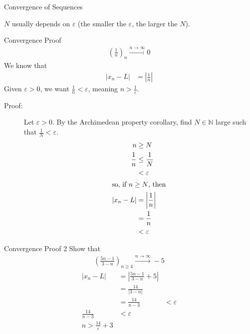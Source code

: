\documentclass[10pt]{extarticle}
\newcommand{\N}{\mathbb{N}}
\begin{document}
\begin{problem}{Convergence of Sequences}
    \begin{description}
      \small
      \item[Note:] $N$ usually depends on $\varepsilon$ (the smaller the $\varepsilon$, the larger the $N$).
    \end{description}
    \begin{problem}{Convergence Proof}
      \begin{align*}
        \left(\frac{1}{n}\right)_{n} \xrightarrow{n\rightarrow\infty} 0
      \end{align*}
      \tcblower
      We know that
      \begin{align*}
        |x_n - L| &= \left|\frac{1}{n}\right|
      \end{align*}
      Given $\varepsilon > 0$, we want $\frac{1}{n} < \varepsilon$, meaning $n > \frac{1}{\varepsilon}$.
      \begin{description}
        \item[Proof:] Let $\varepsilon > 0$. By the Archimedean property corollary, find $N\in\N$ large such that $\frac{1}{N} < \varepsilon$.
          \begin{align*}
            n &\geq N\\
            \frac{1}{n} &\leq \frac{1}{N}\\
                        &< \varepsilon\\
            \shortintertext{so, if $n\geq N$, then}
            |x_n - L| &= \left|\frac{1}{n}\right|\\
                      &= \frac{1}{n}\\
                      &< \varepsilon
          \end{align*}
      \end{description}
    \end{problem}
    \begin{problem}{Convergence Proof 2}
      Show that
      \begin{align*}
        \left(\frac{5n-1}{3-n}\right)_{n\geq 4} \xrightarrow{n\rightarrow\infty} -5
      \end{align*}
      \tcblower
      \begin{align*}
        |x_n - L| &= \left|\frac{5n-1}{3-n} + 5\right|\\
                  &= \frac{14}{|3-n|}\\
                  &= \frac{14}{n-3}
                  &< \varepsilon\\
        \frac{14}{n-3} &< \varepsilon\\
        n > \frac{14}{\varepsilon} + 3

\end{align*}
\end{problem}
\end{problem}
\end{document}
